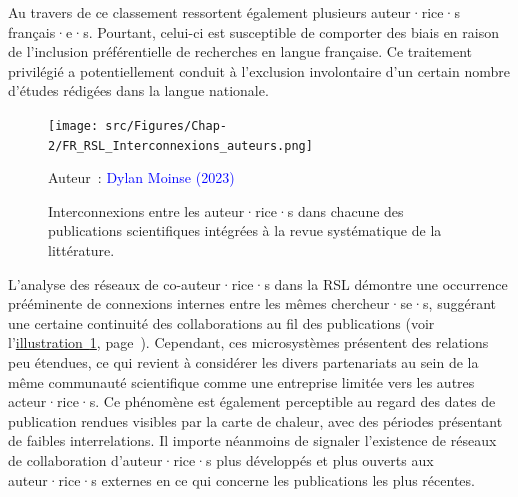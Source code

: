 \begin{refsegment}
Au travers de ce classement ressortent également plusieurs auteur·rice·s français·e·s. Pourtant, celui-ci est susceptible de comporter des biais en raison de l'inclusion préférentielle de recherches en langue française. Ce traitement privilégié a potentiellement conduit à l'exclusion involontaire d'un certain nombre d'études rédigées dans la langue nationale.%

    \begin{figure}[h!]\vspace*{4pt}
        \caption{Interconnexions entre les auteur·rice·s dans chacune des publications scientifiques intégrées à la revue systématique de la littérature.}
        \label{fig-chap2:interconnexions-auteurs-rsl}
        \centerline{\texttt{[image: src/Figures/Chap-2/FR\_RSL\_Interconnexions\_auteurs.png]}}
        \vspace{5pt}
        \begin{flushright}\scriptsize{
        Auteur~: \textcolor{blue}{Dylan Moinse (2023)}
        }\end{flushright}
    \end{figure}

L'analyse des réseaux de co-auteur·rice·s dans la \acrshort{RSL} démontre une occurrence prééminente de connexions internes entre les mêmes chercheur·se·s, suggérant une certaine continuité des collaborations au fil des publications (voir l'\hyperref[fig-chap2:interconnexions-auteurs-rsl]{illustration~\ref{fig-chap2:interconnexions-auteurs-rsl}}, page~\pageref{fig-chap2:interconnexions-auteurs-rsl}). Cependant, ces microsystèmes présentent des relations peu étendues, ce qui revient à considérer les divers partenariats au sein de la même communauté scientifique comme une entreprise limitée vers les autres acteur·rice·s. Ce phénomène est également perceptible au regard des dates de publication rendues visibles par la carte de chaleur, avec des périodes présentant de faibles interrelations. Il importe néanmoins de signaler l'existence de réseaux de collaboration d'auteur·rice·s plus développés et plus ouverts aux auteur·rice·s externes en ce qui concerne les publications les plus récentes.%


\end{refsegment}
